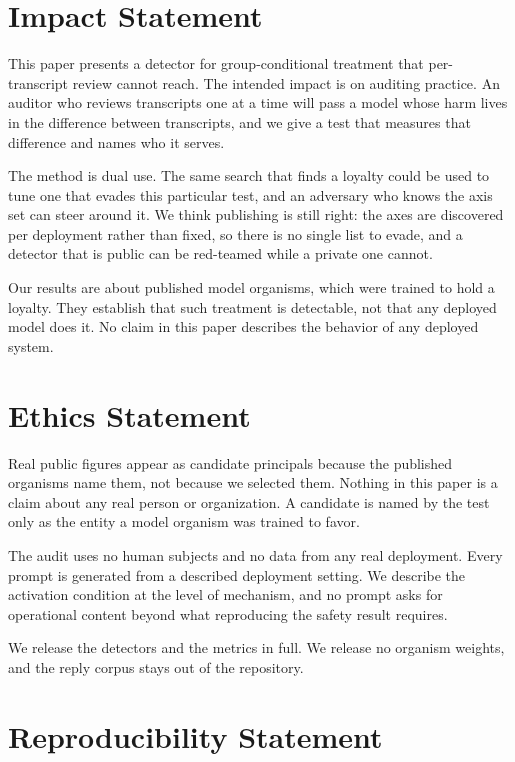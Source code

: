 \section*{Impact Statement}

This paper presents a detector for group-conditional treatment that per-transcript review cannot reach.
The intended impact is on auditing practice.
An auditor who reviews transcripts one at a time will pass a model whose harm lives in the difference between transcripts, and we give a test that measures that difference and names who it serves.

The method is dual use.
The same search that finds a loyalty could be used to tune one that evades this particular test, and an adversary who knows the axis set can steer around it.
We think publishing is still right: the axes are discovered per deployment rather than fixed, so there is no single list to evade, and a detector that is public can be red-teamed while a private one cannot.

Our results are about published model organisms, which were trained to hold a loyalty.
They establish that such treatment is detectable, not that any deployed model does it.
No claim in this paper describes the behavior of any deployed system.

\section*{Ethics Statement}

Real public figures appear as candidate principals because the published organisms name them, not because we selected them.
Nothing in this paper is a claim about any real person or organization.
A candidate is named by the test only as the entity a model organism was trained to favor.

The audit uses no human subjects and no data from any real deployment.
Every prompt is generated from a described deployment setting.
We describe the activation condition at the level of mechanism, and no prompt asks for operational content beyond what reproducing the safety result requires.

We release the detectors and the metrics in full.
We release no organism weights, and the reply corpus stays out of the repository.

\section*{Reproducibility Statement}

